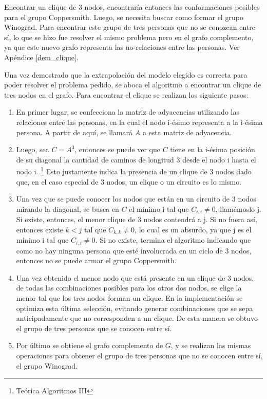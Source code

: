 \documentclass[a4paper, 12pt]{article}
\begin{document}
Encontrar un clique de 3 nodos, encontraría entonces las conformaciones posibles para el grupo Coppersmith. Luego, se necesita buscar como formar el grupo Winograd. Para encontrar este grupo de tres personas que no se conozcan entre sí, lo que se hizo fue resolver el mismo problema pero en el grafo complemento, ya que este nuevo grafo representa las no-relaciones entre las personas. Ver Apéndice \ref{dem_clique}.

Una vez demostrado que la extrapolación del modelo elegido es correcta para poder resolver el problema pedido, se aboca el algoritmo a encontrar un clique de tres nodos en el grafo.
Para encontrar el clique se realizan los siguiente pasos:

\begin{enumerate}
\item En primer lugar, se confecciona la matriz de adyacencias utilizando las relaciones entre las personas, en la cual el nodo i-ésimo representa a la i-ésima persona. A partir de aquí, se llamará $A$ a esta matriz de adyacencia.
\item Luego, sea $C = A^3$, entonces se puede ver que $C$ tiene en la i-ésima posición de su diagonal la cantidad de caminos de longitud 3 desde el nodo i hasta el nodo i. \footnote{Teórica Algoritmos III} Esto justamente indica la presencia de un clique de 3 nodos dado que, en el caso especial de 3 nodos, un clique o un circuito es lo mismo.
\item Una vez que se puede conocer los nodos que están en un circuito de 3 nodos mirando la diagonal, se busca en $C$ el mínimo i tal que $C_{i,i} \neq 0$, llamémoslo j. Si existe, entonces, el menor clique de 3 nodos contendrá a j. Si no fuera así, entonces existe $k < j$ tal que $C_{k,k} \neq 0$, lo cual es un absurdo, ya que j es el mínimo i tal que $C_{i,i} \neq 0$. Si no existe, termina el algoritmo indicando que como no hay ninguna persona que esté involucrada en un ciclo de 3 nodos, entonces no se puede armar el grupo Coppersmith.
\item Una vez obtenido el menor nodo que está presente en un clique de 3 nodos, de todas las combinaciones posibles para los otros dos nodos, se elige la menor tal que los tres nodos forman un clique. En la implementación se optimiza esta última selección, evitando generar combinaciones que se sepa anticipadamente que no corresponden a un clique. De esta manera se obtuvo el grupo de tres personas que se conocen entre sí.
\item Por último se obtiene el grafo complemento de $G$, y se realizan las mismas operaciones para obtener el grupo de tres personas que no se conocen entre sí, el grupo Winograd.
\end{enumerate}
\end{document}
